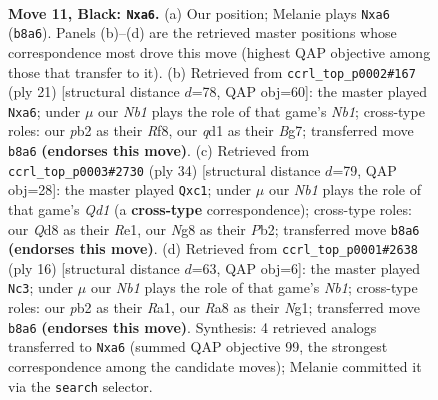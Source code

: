 \documentclass[11pt]{article}
\begin{document}
\clearpage

\begin{figure}[p]\centering
\begin{subfigure}{0.46\textwidth}\centering
\resizebox{\linewidth}{!}{%
\newchessgame
\chessboard[
  setfen={rn1qkbnr/3p3p/B4pp1/2pP4/4PpPP/2N5/PP6/R1BQK1NR b KQkq - 0 11},
  showmover=false,
  pgfstyle=straightmove, color=movearrow, markmove={b8-a6}
]}
\caption{}
\end{subfigure}\hfill
\begin{subfigure}{0.46\textwidth}\centering
\resizebox{\linewidth}{!}{%
\newchessgame
\chessboard[
  setfen={rn1q1rk1/4ppbp/B2p1np1/2pP4/P3P2P/2N5/1P3PP1/R1BQK1NR b KQ - 0 11},
  showmover=false,
  pgfstyle=straightmove, color=movearrow, markmove={b8-a6}
]}
\caption{}
\end{subfigure}
\\[4pt]
\begin{subfigure}{0.46\textwidth}\centering
\resizebox{\linewidth}{!}{%
\newchessgame
\chessboard[
  setfen={r1bq1rk1/pp3p1p/2pn2p1/3p4/8/2PP1N2/PP3PPP/R1bQRBK1 w - - 0 18},
  showmover=false,
  pgfstyle=straightmove, color=movearrow, markmove={d1-c1}
]}
\caption{}
\end{subfigure}\hfill
\begin{subfigure}{0.46\textwidth}\centering
\resizebox{\linewidth}{!}{%
\newchessgame
\chessboard[
  setfen={r1b1k1nr/pp2qppp/2np4/8/2P1p3/4P1P1/PP1Q1P1P/RN2KBNR w KQkq - 0 9},
  showmover=false,
  pgfstyle=straightmove, color=movearrow, markmove={b1-c3}
]}
\caption{}
\end{subfigure}
\caption{\textbf{Move 11, Black: \texttt{Nxa6}.} (a) Our position; Melanie plays \texttt{Nxa6} (\texttt{b8a6}). Panels (b)--(d) are the retrieved master positions whose correspondence most drove this move (highest QAP objective among those that transfer to it). (b) Retrieved from \texttt{ccrl\_top\_p0002\#167} (ply 21) [structural distance $d$=78, QAP obj=60]: the master played \texttt{Nxa6}; under $\mu$ our \emph{Nb1} plays the role of that game's \emph{Nb1}; cross-type roles: our \emph{p}b2 as their \emph{R}f8, our \emph{q}d1 as their \emph{B}g7; transferred move \texttt{b8a6} \textbf{(endorses this move)}. (c) Retrieved from \texttt{ccrl\_top\_p0003\#2730} (ply 34) [structural distance $d$=79, QAP obj=28]: the master played \texttt{Qxc1}; under $\mu$ our \emph{Nb1} plays the role of that game's \emph{Qd1} (a \textbf{cross-type} correspondence); cross-type roles: our \emph{Q}d8 as their \emph{R}e1, our \emph{N}g8 as their \emph{P}b2; transferred move \texttt{b8a6} \textbf{(endorses this move)}. (d) Retrieved from \texttt{ccrl\_top\_p0001\#2638} (ply 16) [structural distance $d$=63, QAP obj=6]: the master played \texttt{Nc3}; under $\mu$ our \emph{Nb1} plays the role of that game's \emph{Nb1}; cross-type roles: our \emph{p}b2 as their \emph{R}a1, our \emph{R}a8 as their \emph{N}g1; transferred move \texttt{b8a6} \textbf{(endorses this move)}. Synthesis: 4 retrieved analogs transferred to \texttt{Nxa6} (summed QAP objective 99, the strongest correspondence among the candidate moves); Melanie committed it via the \texttt{search} selector.}
\label{fig:thought-m21}
\end{figure}
\end{document}
